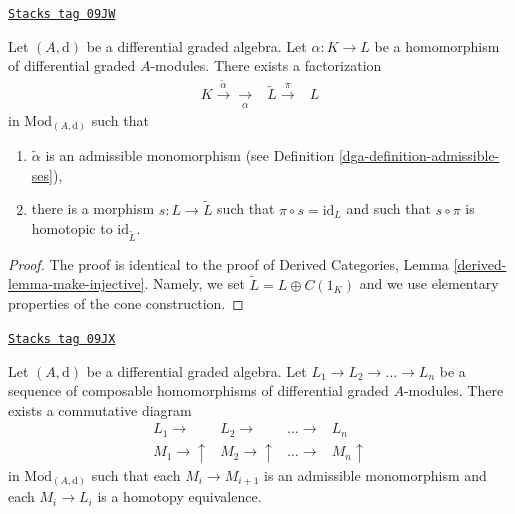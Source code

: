 \begin{lemma}
\label{dga-lemma-make-injective}
\href{https://stacks.math.columbia.edu/tag/09JW}{\texttt{Stacks tag 09JW}}

Let $(A, \text{d})$ be a differential graded algebra.
Let $\alpha : K \to L$ be a homomorphism of differential graded
$A$-modules. There exists a factorization
$$
\begin{array}{ccc}K \overset{\tilde \alpha}{\longrightarrow}\underset{\alpha}{\longrightarrow} & \tilde L \overset{\pi}{\longrightarrow} & L\end{array}
$$
in $\text{Mod}_{(A, \text{d})}$ such that
\begin{enumerate}
\item $\tilde \alpha$ is an admissible monomorphism (see
Definition \ref{dga-definition-admissible-ses}),
\item there is a morphism $s : L \to \tilde L$
such that $\pi \circ s = \text{id}_L$ and such that
$s \circ \pi$ is homotopic to $\text{id}_{\tilde L}$.
\end{enumerate}
\end{lemma}

\begin{proof}
The proof is identical to the proof of
Derived Categories, Lemma \ref{derived-lemma-make-injective}.
Namely, we set $\tilde L = L \oplus C(1_K)$ and we use elementary
properties of the cone construction.
\end{proof}

\begin{lemma}
\label{dga-lemma-sequence-maps-split}
\href{https://stacks.math.columbia.edu/tag/09JX}{\texttt{Stacks tag 09JX}}

Let $(A, \text{d})$ be a differential graded algebra.
Let $L_1 \to L_2 \to \ldots \to L_n$
be a sequence of composable homomorphisms of
differential graded $A$-modules.
There exists a commutative diagram
$$
\begin{array}{cccc}L_1 \longrightarrow & L_2 \longrightarrow & \ldots \longrightarrow & L_n \\ M_1 \longrightarrow\uparrow & M_2 \longrightarrow\uparrow & \ldots \longrightarrow & M_n \uparrow\end{array}
$$
in $\text{Mod}_{(A, \text{d})}$ such that each $M_i \to M_{i + 1}$
is an admissible monomorphism and each $M_i \to L_i$
is a homotopy equivalence.
\end{lemma}

